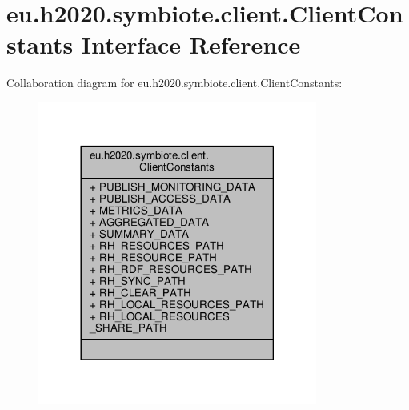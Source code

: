 \hypertarget{interfaceeu_1_1h2020_1_1symbiote_1_1client_1_1ClientConstants}{}\section{eu.\+h2020.\+symbiote.\+client.\+Client\+Constants Interface Reference}
\label{interfaceeu_1_1h2020_1_1symbiote_1_1client_1_1ClientConstants}


Collaboration diagram for eu.\+h2020.\+symbiote.\+client.\+Client\+Constants\+:\nopagebreak
\begin{figure}[H]
\begin{center}
\leavevmode
\includegraphics[width=260pt]{interfaceeu_1_1h2020_1_1symbiote_1_1client_1_1ClientConstants__coll__graph}
\end{center}
\end{figure}
